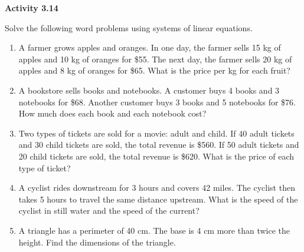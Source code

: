  \vspace{0.3ex}
\noindent\textbf{Activity 3.14}

\vspace{0.2ex}

Solve the following word problems using systems of linear equations.
\begin{enumerate}[noitemsep, label = \color{blue}\arabic*. ]
    \item A farmer grows apples and oranges. In one day, the farmer sells 15 kg of apples and 10 kg of oranges for \$55. The next day, the farmer sells 20 kg of apples and 8 kg of oranges for \$65. What is the price per kg for each fruit?
    
    \item A bookstore sells books and notebooks. A customer buys 4 books and 3 notebooks for \$68. Another customer buys 3 books and 5 notebooks for \$76. How much does each book and each notebook cost?
    
    \item Two types of tickets are sold for a movie: adult and child. If 40 adult tickets and 30 child tickets are sold, the total revenue is \$560. If 50 adult tickets and 20 child tickets are sold, the total revenue is \$620. What is the price of each type of ticket?
    
    \item A cyclist rides downstream for 3 hours and covers 42 miles. The cyclist then takes 5 hours to travel the same distance upstream. What is the speed of the cyclist in still water and the speed of the current?
    
    \item A triangle has a perimeter of 40 cm. The base is 4 cm more than twice the height. Find the dimensions of the triangle.
    
    
    

\end{enumerate}
